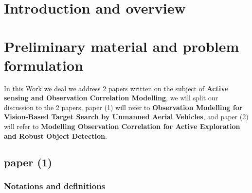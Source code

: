 \documentclass{article}
\begin{document}
	\section{Introduction and overview}
	\section{Preliminary material and problem formulation}
	In this Work we deal we address 2 papers written on the subject of \textbf{Active sensing and Observation Correlation Modelling},
	we will split our discussion to the 2 papers, paper (1) will refer to \textbf{Observation Modelling for Vision-Based Target Search by Unmanned Aerial Vehicles}, and paper (2) will refer to \textbf{Modelling Observation Correlation for Active Exploration and Robust Object Detection}.
	\subsection{paper (1)}
	
	\subsubsection{Notations and definitions}
	
\end{document}
